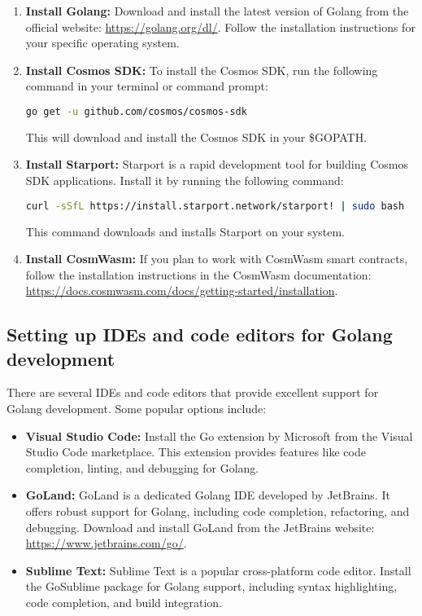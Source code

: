 \documentclass{article}
\begin{document}
\begin{enumerate}
\item \textbf{Install Golang:} Download and install the latest version of Golang from the official website: \url{https://golang.org/dl/}. Follow the installation instructions for your specific operating system.


\item \textbf{Install Cosmos SDK:} To install the Cosmos SDK, run the following command in your terminal or command prompt:

\begin{lstlisting}[language=bash]
go get -u github.com/cosmos/cosmos-sdk
\end{lstlisting}

This will download and install the Cosmos SDK in your \$GOPATH.

\item \textbf{Install Starport:} Starport is a rapid development tool for building Cosmos SDK applications. Install it by running the following command:

\begin{lstlisting}[language=bash]
curl -sSfL https://install.starport.network/starport! | sudo bash
\end{lstlisting}

This command downloads and installs Starport on your system.

\item \textbf{Install CosmWasm:} If you plan to work with CosmWasm smart contracts, follow the installation instructions in the CosmWasm documentation: \url{https://docs.cosmwasm.com/docs/getting-started/installation}.
\end{enumerate}

\subsection{Setting up IDEs and code editors for Golang development}

There are several IDEs and code editors that provide excellent support for Golang development. Some popular options include:

\begin{itemize}
\item \textbf{Visual Studio Code:} Install the Go extension by Microsoft from the Visual Studio Code marketplace. This extension provides features like code completion, linting, and debugging for Golang.


\item \textbf{GoLand:} GoLand is a dedicated Golang IDE developed by JetBrains. It offers robust support for Golang, including code completion, refactoring, and debugging. Download and install GoLand from the JetBrains website: \url{https://www.jetbrains.com/go/}.

\item \textbf{Sublime Text:} Sublime Text is a popular cross-platform code editor. Install the GoSublime package for Golang support, including syntax highlighting, code completion, and build integration.
\end{itemize}
\end{document}
